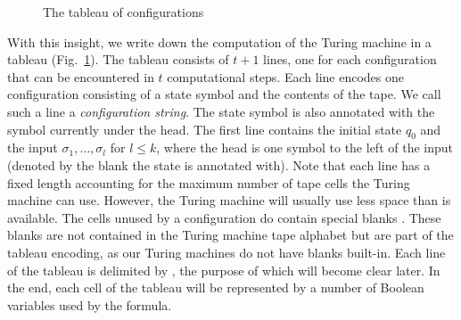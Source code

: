 \begin{figure}
\begin{center}
  \end{center}
  \caption{The tableau of configurations}\label{fig:tableau}
\end{figure}

With this insight, we write down the computation of the Turing machine in a tableau (Fig.~\ref{fig:tableau}).
The tableau consists of $t+1$ lines, one for each configuration that can be encountered in $t$ computational steps. Each line encodes one configuration consisting of a state symbol and the contents of the tape. We call such a line a \emph{configuration string}. The state symbol is also annotated with the symbol currently under the head.
The first line contains the initial state $q_0$ and the input $\sigma_1, \ldots, \sigma_l$ for $l \le k$, where the head is one symbol to the left of the input (denoted by the blank the state is annotated with).
Note that each line has a fixed length accounting for the maximum number of tape cells the Turing machine can use. However, the Turing machine will usually use less space than is available. The cells unused by a configuration do contain special blanks \blank.
These blanks are not contained in the Turing machine tape alphabet but are part of the tableau encoding, as our Turing machines do not have blanks built-in.
Each line of the tableau is delimited by \delim, the purpose of which will become clear later.
In the end, each cell of the tableau will be represented by a number of Boolean variables used by the \SAT{} formula.


